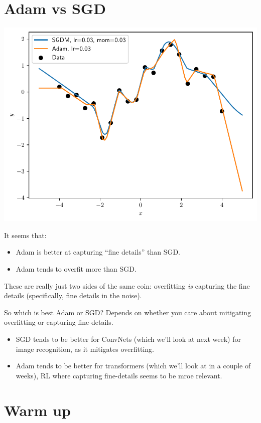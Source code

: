\documentclass{article}
\newcommand{\0}{\mathbf{0}}
\begin{document}
\newpage
\section{Adam vs SGD}

\includegraphics[width=\textwidth]{adam_vs_sgd.pdf}

It seems that:
\begin{itemize}
  \item Adam is better at capturing ``fine details'' than SGD.
  \item Adam tends to overfit more than SGD.
\end{itemize}
These are really just two sides of the same coin: overfitting \textit{is} capturing the fine details (specifically, fine details in the noise).

So which is best Adam or SGD?  Depends on whether you care about mitigating overfitting or capturing fine-details.
\begin{itemize}
  \item SGD tends to be better for ConvNets (which we'll look at next week) for image recognition, as it mitigates overfitting.
  \item Adam tends to be better for transformers (which we'll look at in a couple of weeks), RL where capturing fine-details seems to be mroe relevant.
\end{itemize}

\newpage
\section{Warm up}
\end{document}
